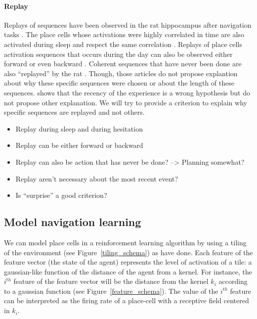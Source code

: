 \documentclass[]{article}
\begin{document}
\paragraph{Replay}
Replays of sequences have been observed in the rat hippocampus after navigation tasks \parencite{wilson_reactivation_1994, skaggs_replay_1996, davidson_hippocampal_2009, gupta_hippocampal_2010}. The place cells whose activations were highly correlated in time are also activated during sleep and respect the same correlation \parencite{wilson_reactivation_1994}. Replays of place cells activation sequences that occurs during the day can also be observed either forward \parencite{skaggs_replay_1996} or even backward \parencite{gupta_hippocampal_2010}. Coherent sequences that have never been done are also ``replayed'' by the rat \parencite{gupta_hippocampal_2010}. Though, those articles do not propose explantion about why these specific sequences were chosen or about the length of these sequences. \textcite{gupta_hippocampal_2010} shows that the recency of the experience is a wrong hypothesis but do not propose other explanation. We will try to provide a criterion to explain why specific sequences are replayed and not others.



\begin{itemize}
\item Replay during sleep and during hesitation
\item Replay can be either forward or backward
\item Replay can also be action that has never be done? --> Planning somewhat?
\item Replay aren't necessary about the most recent event?
\item Is ``surprise'' a good criterion?
\end{itemize}

\subsection{Model navigation learning}\label{model-navigation-learning}

We can model place cells in a reinforcement learning algorithm by using a tiling of the environment (see Figure~\ref{tiling_schema}) as \textcite{	tamosiunaite_path-finding_2008} have done. Each feature of the feature vector (the state of the agent) represents the level of activation of a tile: a gaussian-like function of the distance of the agent from a kernel. For instance, the \(i^{th}\) feature of the feature vector will be the distance from the kernel \(k_i\) according to a gaussian function (see Figure~\ref{feature_schema}). The value of the \(i^{th}\) feature can be interpreted as the firing rate of a place-cell with a receptive field centered in \(k_i\).
\end{document}
